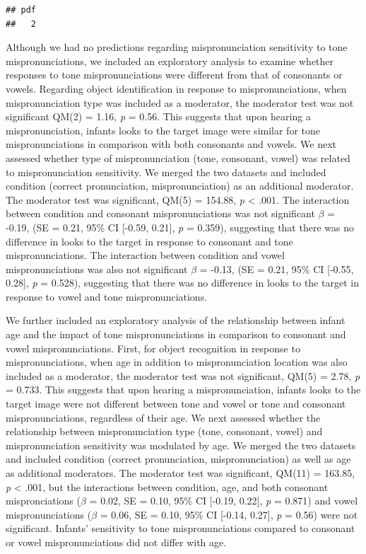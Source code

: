 \documentclass[man]{apa6}
\theoremstyle{definition}
\theoremstyle{definition}
\theoremstyle{definition}
\theoremstyle{remark}
\begin{document}
\begin{verbatim}
## pdf 
##   2
\end{verbatim}

Although we had no predictions regarding mispronunciation sensitivity to
tone mispronunciations, we included an exploratory analysis to examine
whether responses to tone mispronunciations were different from that of
consonants or vowels. Regarding object identification in response to
mispronunciations, when mispronunciation type was included as a
moderator, the moderator test was not significant QM(2) = 1.16, \emph{p}
= 0.56. This suggests that upon hearing a mispronunciation, infants
looks to the target image were similar for tone mispronunciations in
comparison with both consonants and vowels. We next assessed whether
type of mispronunciation (tone, consonant, vowel) was related to
mispronunciation sensitivity. We merged the two datasets and included
condition (correct pronunciation, mispronunciation) as an additional
moderator. The moderator test was significant, QM(5) = 154.88, \emph{p}
\textless{} .001. The interaction between condition and consonant
mispronunciations was not significant \(\beta\) = -0.19, (SE = 0.21,
95\% CI {[}-0.59, 0.21{]}, \emph{p} = 0.359), suggesting that there was
no difference in looks to the target in response to consonant and tone
mispronunciations. The interaction between condition and vowel
mispronunciations was also not significant \(\beta\) = -0.13, (SE =
0.21, 95\% CI {[}-0.55, 0.28{]}, \emph{p} = 0.528), suggesting that
there was no difference in looks to the target in response to vowel and
tone mispronunciations.

We further included an exploratory analysis of the relationship between
infant age and the impact of tone mispronunciations in comparison to
consonant and vowel mispronunciations. First, for object recognition in
response to mispronunciations, when age in addition to mispronunciation
location was also included as a moderator, the moderator test was not
significant, QM(5) = 2.78, \emph{p} = 0.733. This suggests that upon
hearing a mispronunciation, infants looks to the target image were not
different between tone and vowel or tone and consonant
mispronunciations, regardless of their age. We next assessed whether the
relationship between mispronunciation type (tone, consonant, vowel) and
mispronunciation sensitivity was modulated by age. We merged the two
datasets and included condition (correct pronunciation,
mispronunciation) as well as age as additional moderators. The moderator
test was significant, QM(11) = 163.85, \emph{p} \textless{} .001, but
the interactions between condition, age, and both consonant
mispronciations (\(\beta\) = 0.02, SE = 0.10, 95\% CI {[}-0.19, 0.22{]},
\emph{p} = 0.871) and vowel mispronunciations (\(\beta\) = 0.06, SE =
0.10, 95\% CI {[}-0.14, 0.27{]}, \emph{p} = 0.56) were not significant.
Infants' sensitivity to tone mispronunciations compared to consonant or
vowel mispronunciations did not differ with age.
\end{document}
